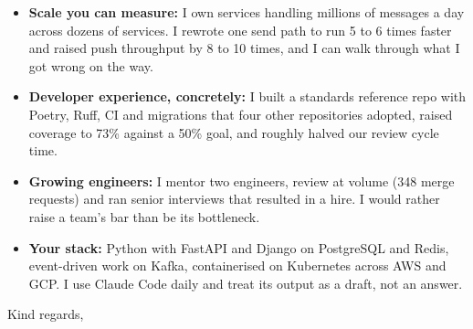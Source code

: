 \documentclass[]{cover}
\begin{document}
\currentdate{\today}



{\raggedright{}\fontsize{11pt}{13pt}\selectfont
\begin{itemize}
    \item \textbf{Scale you can measure:} I own services handling millions of messages a day across dozens of services. I rewrote one send path to run 5 to 6 times faster and raised push throughput by 8 to 10 times, and I can walk through what I got wrong on the way.
    \item \textbf{Developer experience, concretely:} I built a standards reference repo with Poetry, Ruff, CI and migrations that four other repositories adopted, raised coverage to 73\% against a 50\% goal, and roughly halved our review cycle time.
    \item \textbf{Growing engineers:} I mentor two engineers, review at volume (348 merge requests) and ran senior interviews that resulted in a hire. I would rather raise a team's bar than be its bottleneck.
    \item \textbf{Your stack:} Python with FastAPI and Django on PostgreSQL and Redis, event-driven work on Kafka, containerised on Kubernetes across AWS and GCP. I use Claude Code daily and treat its output as a draft, not an answer.
\end{itemize}\par}
\vspace{6pt}


\begin{flushright}
\closing{Kind regards,}
\signature{Artem Sokoliuk}
\end{flushright}
\end{document}
